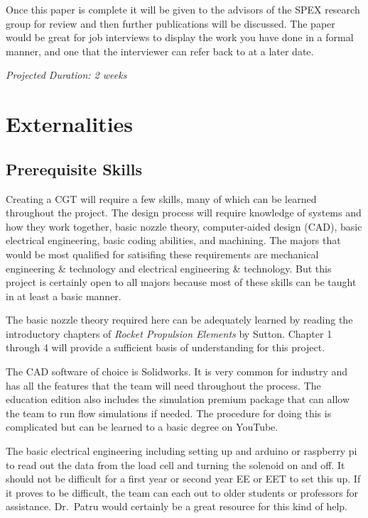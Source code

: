 \documentclass[conference]{IEEEtran} %
\begin{document}
    Once this paper is complete it will be given to the advisors of the SPEX research group for review and then further publications will be discussed. The paper would
    be great for job interviews to display the work you have done in a formal manner, and one that the interviewer can refer back to at a later date.

    \textit{Projected Duration: 2 weeks}

\section{Externalities}
\subsection{Prerequisite Skills}

Creating a CGT will require a few skills, many of which can be learned throughout the project. The design process will require knowledge of systems and how they
work together, basic nozzle theory, computer-aided design (CAD), basic electrical engineering, basic coding abilities, and machining. The majors that would
be most qualified for satisifing these requirements are mechanical engineering \& technology and electrical engineering \& technology. But this project is certainly
open to all majors because most of these skills can be taught in at least a basic manner.

The basic nozzle theory required here can be adequately learned by reading the introductory chapters of \textit{Rocket Propulsion Elements} by Sutton\cite{RPE}. Chapter 1 through 4 will
provide a sufficient basis of understanding for this project.

 The CAD software of choice is Solidworks. It is very common for industry and has all the features that the team
will need throughout the process. The education edition also includes the simulation premium package that can allow the team to run flow simulations if needed. The procedure for
doing this is complicated but can be learned to a basic degree on YouTube.

The basic electrical engineering including setting up and arduino or raspberry pi to read out the data from the load cell and turning the solenoid on and off. It
should not be difficult for a first year or second year EE or EET to set this up. If it proves to be difficult, the team can each out to older students or professors for assistance.
Dr.\ Patru would certainly be a great resource for this kind of help.
\end{document}
